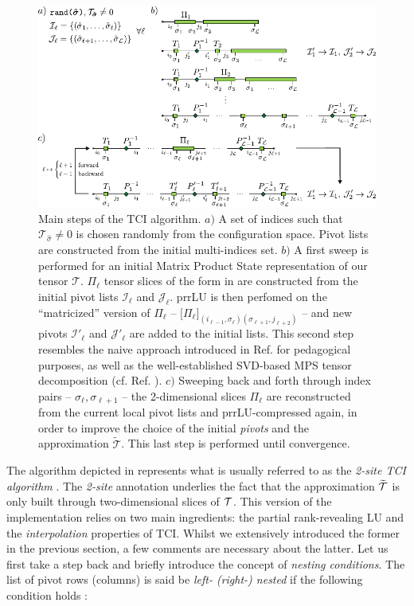 \begin{figure}[ht!]
	\centering
	\includegraphics[width=\textwidth]{figures/TCI.pdf}
	\caption{Main steps of the TCI algorithm. $a)$ A set of indices such that $\mathcal{T}_{\hat \sigma} \neq 0$ is chosen randomly from the configuration space. Pivot lists are constructed from the initial multi-indices set. $b)$ A first sweep is performed for an initial Matrix Product State representation of our tensor $\mathcal{T}$. $\Pi_\ell$ tensor slices of the form in  are constructed from the initial pivot lists $\mathcal{I}_\ell$ and $\mathcal{J}_\ell$. prrLU is then perfomed on the ``matricized'' version of $\Pi_\ell$ -- $\bigl[\Pi_\ell\bigr]_{(i_{\ell -1}, \sigma_\ell) (\sigma_{\ell+1}, j_{\ell +2})}$ -- and new pivots $\mathcal{I}'_\ell$ and $\mathcal{J}'_\ell$ are added to the initial lists. This second step resembles the naive approach introduced in Ref. \cite{Fernandez2022} for pedagogical purposes, as well as the well-established SVD-based MPS tensor decomposition (cf. Ref. \cite{vonDelftTNNotes}). $c)$ Sweeping back and forth through index pairs -- $\sigma_\ell, \sigma_{\ell +1}$ -- the 2-dimensional slices $\Pi_\ell$ are reconstructed from the current local pivot lists and prrLU-compressed again, in order to improve the choice of the initial \textit{pivots} and the approximation $\widetilde{\mathcal{T}}$. This last step is performed until convergence.}
	\label{fig:TCIalg}
\end{figure}

The algorithm depicted in  represents what is usually referred to as the \textit{2-site TCI algorithm} \cite{Fernandez2024}. The \textit{2-site} annotation underlies the fact that the approximation $\widetilde{\mathcal{T}}$ is only built through two-dimensional slices of $\mathcal{T}$. This version of the implementation relies on two main ingredients: the partial rank-revealing LU and the \textit{interpolation} properties of TCI. Whilst we extensively introduced the former in the previous section, a few comments are necessary about the latter. Let us first take a step back and briefly introduce the concept of \textit{nesting conditions}. The list of pivot rows (columns) is said be \textit{left- (right-) nested} if the following condition holds \cite{Oseledets2011, Dolgov2020}:

